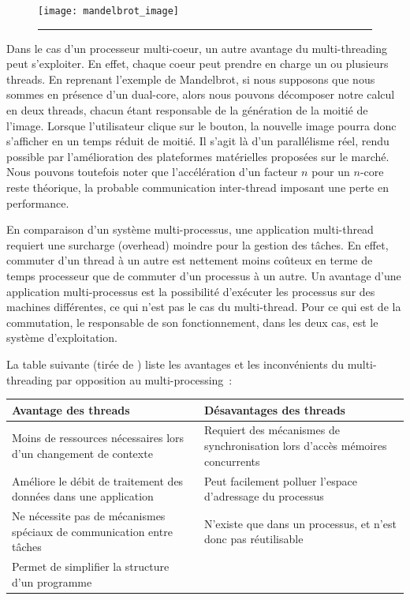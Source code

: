 \begin{figure}[ht]
\begin{center}
\texttt{[image: mandelbrot\_image]}
\end{center}
\vspace{-.3cm}
\rule{\textwidth}{0.01in}
\end{figure}

Dans le cas d'un processeur multi-coeur, un autre avantage du multi-threading peut s'exploiter. En effet, chaque coeur peut prendre en charge un ou plusieurs threads. En reprenant l'exemple de Mandelbrot, si nous supposons que nous sommes en présence d'un dual-core, alors nous pouvons décomposer notre calcul en deux threads, chacun étant responsable de la génération de la moitié de l'image. Lorsque l'utilisateur clique sur le bouton, la nouvelle image pourra donc s'afficher en un temps réduit de moitié. Il s'agit là d'un parallélisme réel, rendu possible par l'amélioration des plateformes matérielles proposées sur le marché. Nous pouvons toutefois noter que l'accélération d'un facteur $n$ pour un $n$-core reste théorique, la probable communication inter-thread imposant une perte en performance.

En comparaison d'un système multi-processus, une application multi-thread requiert une surcharge (overhead) moindre pour la gestion des tâches. En effet, commuter d'un thread à un autre est nettement moins coûteux en terme de temps processeur que de commuter d'un processus à un autre. Un avantage d'une application multi-processus est la possibilité d'exécuter les processus sur des machines différentes, ce qui n'est pas le cas du multi-thread. Pour ce qui est de la commutation, le responsable de son fonctionnement, dans les deux cas, est le système d'exploitation.

La table suivante (tirée de \cite{hughes03parallel}) liste les avantages et les inconvénients du multi-threading par opposition au multi-processing~:

\begin{center}
\begin{tabular}{p{}|p{}}
\toprule
\textbf{Avantage des threads} & \textbf{Désavantages des threads} \\
\midrule
Moins de ressources nécessaires lors d'un changement de contexte & Requiert des mécanismes de synchronisation lors d'accès mémoires concurrents \\
Améliore le débit de traitement des données dans une application & Peut facilement polluer l'espace d'adressage du processus \\
Ne nécessite pas de mécanismes spéciaux de communication entre tâches & N'existe que dans un processus, et n'est donc pas réutilisable \\
Permet de simplifier la structure d'un programme & \\
\bottomrule
\end{tabular}
\end{center}

